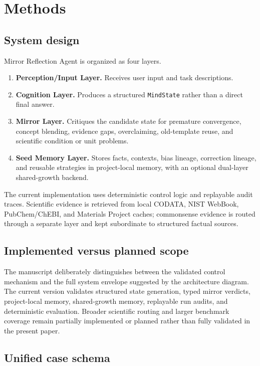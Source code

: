 \documentclass[12pt]{article}
\begin{document}
\section{Methods}

\subsection{System design}

Mirror Reflection Agent is organized as four layers.
\begin{enumerate}
\item \textbf{Perception/Input Layer.} Receives user input and task descriptions.
\item \textbf{Cognition Layer.} Produces a structured \texttt{MindState} rather than a direct final answer.
\item \textbf{Mirror Layer.} Critiques the candidate state for premature convergence, concept blending, evidence gaps, overclaiming, old-template reuse, and scientific condition or unit problems.
\item \textbf{Seed Memory Layer.} Stores facts, contexts, bias lineage, correction lineage, and reusable strategies in project-local memory, with an optional dual-layer shared-growth backend.
\end{enumerate}

The current implementation uses deterministic control logic and replayable audit traces. Scientific evidence is retrieved from local CODATA, NIST WebBook, PubChem/ChEBI, and Materials Project caches; commonsense evidence is routed through a separate layer and kept subordinate to structured factual sources.

\subsection{Implemented versus planned scope}

The manuscript deliberately distinguishes between the validated control mechanism and the full system envelope suggested by the architecture diagram. The current version validates structured state generation, typed mirror verdicts, project-local memory, shared-growth memory, replayable run audits, and deterministic evaluation. Broader scientific routing and larger benchmark coverage remain partially implemented or planned rather than fully validated in the present paper.

\subsection{Unified case schema}
\end{document}
